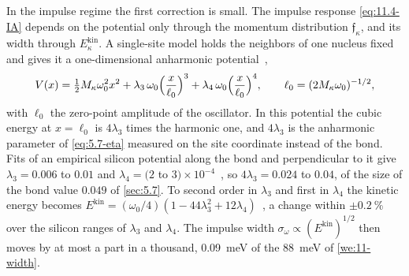 In the impulse regime the first correction is small. The impulse response \cref{eq:11.4-IA} depends on the potential only through the momentum distribution $\mathfrak{f}_\kappa$, and its width through $E^{\mathrm{kin}}_\kappa$. A single-site model holds the neighbors of one nucleus fixed and gives it a one-dimensional anharmonic potential~\cite[Eq.~(26)]{lin2024anharmonic},
\begin{equation}
  V(x) = \tfrac12M_\kappa\omega_0^2x^2 + \lambda_3\,\omega_0\Bigl(\frac{x}{\ell_0}\Bigr)^3 + \lambda_4\,\omega_0\Bigl(\frac{x}{\ell_0}\Bigr)^4 , \qquad \ell_0 = (2M_\kappa\omega_0)^{-1/2} ,
  \label{eq:11.5-toy}
\end{equation}
with $\ell_0$ the zero-point amplitude of the oscillator. In this potential the cubic energy at $x = \ell_0$ is $4\lambda_3$ times the harmonic one, and $4\lambda_3$ is the anharmonic parameter of \cref{eq:5.7-eta} measured on the site coordinate instead of the bond. Fits of an empirical silicon potential along the bond and perpendicular to it give $\lambda_3 = 0.006$ to $0.01$ and $\lambda_4 = (2$ to $3)\times10^{-4}$~\cite[Sect.~IV]{lin2024anharmonic}, so $4\lambda_3 = 0.024$ to $0.04$, of the size of the bond value $0.049$ of \cref{sec:5.7}. To second order in $\lambda_3$ and first in $\lambda_4$ the kinetic energy becomes $E^{\mathrm{kin}} = (\omega_0/4)(1 - 44\lambda_3^2 + 12\lambda_4)$~\cite[Eq.~(65)]{lin2024anharmonic}, a change within $\pm\SI{0.2}{\percent}$ over the silicon ranges of $\lambda_3$ and $\lambda_4$. The impulse width $\sigma_\omega \propto (E^{\mathrm{kin}})^{1/2}$ then moves by at most a part in a thousand, \SI{0.09}{meV} of the \SI{88}{meV} of \cref{we:11-width}.

